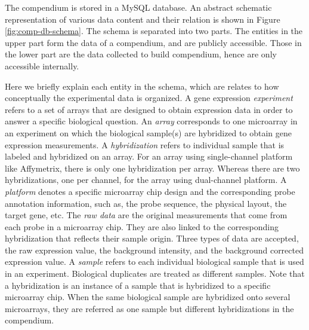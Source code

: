 The compendium is stored in a MySQL database. An abstract schematic
representation of various data content and their relation is shown in Figure
\ref{fig:comp-db-schema}.
%
The schema is separated into two parts. The entities in the upper part form
the data of a compendium, and are publicly accessible.
%
Those in the lower part are the data collected to build compendium, hence are
only accessible internally.

Here we briefly explain each entity in the schema, which are relates to how
conceptually the experimental data is organized.
%
A gene expression \textit{experiment} refers to a set of arrays that are
designed to obtain expression data in order to answer a specific biological
question.
%
An \textit{array} corresponds to one microarray in an experiment on which the
biological sample(s) are hybridized to obtain gene expression measurements.
%
A \textit{hybridization} refers to individual sample that is labeled and
hybridized on an array.
%
For an array using single-channel platform like Affymetrix, there is only one
hybridization per array.  Whereas there are two hybridizations, one per
channel, for the array using dual-channel platform.
%
A \textit{platform} denotes a specific microarray chip design and the
corresponding probe annotation information, such as, the probe sequence, the
physical layout, the target gene, etc.
%
The \textit{raw data} are the original measurements that come from each probe
in a microarray chip.  They are also linked to the corresponding hybridization
that reflects their sample origin.
%
Three types of data are accepted, the raw expression value, the background
intensity, and the background corrected expression value.
%
% 
%
A \textit{sample} refers to each individual biological sample that is used in
an experiment.  Biological duplicates are treated as different samples.
%
Note that a hybridization is an instance of a sample that is hybridized to a
specific microarray chip.  When the same biological sample are hybridized
onto several microarrays, they are referred as one sample but different
hybridizations in the compendium.
%
